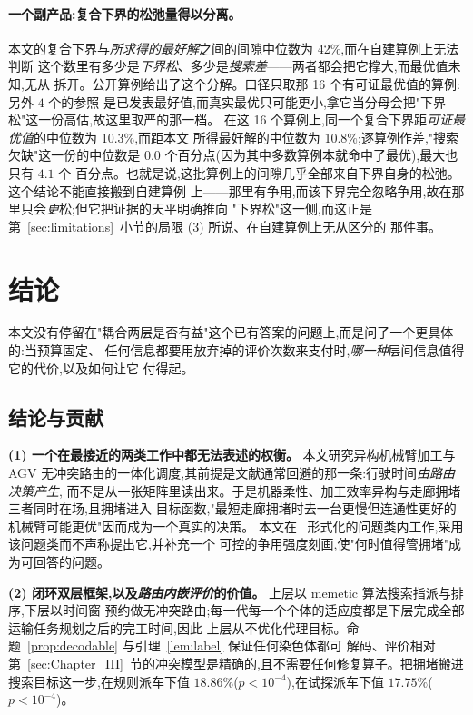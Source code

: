 \documentclass[manuscript,screen,review]{acmart}
\newcommand{\GainLoopRule}{18.86\%}      %
\newcommand{\PLoopRule}{<10^{-4}}
\newcommand{\GainLoopProbe}{17.75\%}     %
\newcommand{\PLoopProbe}{<10^{-4}}
\newcommand{\LBGapMed}{42\%}
\newcommand{\PubNOpt}{16}                 %
\newcommand{\PubLBSlack}{10.3\%}          %
\newcommand{\PubLBTotal}{10.8\%}          %
\newcommand{\PubLBResidMed}{0.0}          %
\newcommand{\PubLBResidMax}{4.1}          %
\begin{document}
\paragraph{一个副产品:复合下界的松弛量得以分离。}
本文的复合下界与\emph{所求得的最好解}之间的间隙中位数为 \LBGapMed{},而在自建算例上无法判断
这个数里有多少是\emph{下界松}、多少是\emph{搜索差}——两者都会把它撑大,而最优值未知,无从
拆开。公开算例给出了这个分解。口径只取那 \PubNOpt{} 个有可证最优值的算例:另外 $4$ 个的参照
是已发表最好值,而真实最优只可能更小,拿它当分母会把"下界松"这一份高估,故这里取严的那一档。
在这 \PubNOpt{} 个算例上,同一个复合下界距\emph{可证最优值}的中位数为 \PubLBSlack{},而距本文
所得最好解的中位数为 \PubLBTotal{};逐算例作差,"搜索欠缺"这一份的中位数是
$\PubLBResidMed$ 个百分点(因为其中多数算例本就命中了最优),最大也只有 $\PubLBResidMax$ 个
百分点。也就是说,这批算例上的间隙几乎全部来自下界自身的松弛。这个结论不能直接搬到自建算例
上——那里有争用,而该下界完全忽略争用,故在那里只会\emph{更}松;但它把证据的天平明确推向
"下界松"这一侧,而这正是第~\ref{sec:limitations}~小节的局限 (3) 所说、在自建算例上无从区分的
那件事。

\section{结论}

本文没有停留在"耦合两层是否有益"这个已有答案的问题上,而是问了一个更具体的:当预算固定、
任何信息都要用放弃掉的评价次数来支付时,\emph{哪一种}层间信息值得它的代价,以及如何让它
付得起。

\subsection{结论与贡献}
\label{sec:contributions}

\textbf{(1) 一个在最接近的两类工作中都无法表述的权衡。} 本文研究异构机械臂加工与 AGV
无冲突路由的一体化调度,其前提是文献通常回避的那一条:行驶时间\emph{由路由决策产生},
而不是从一张矩阵里读出来。于是机器柔性、加工效率异构与走廊拥堵三者同时在场,且拥堵进入
目标函数,"最短走廊拥堵时去一台更慢但连通性更好的机械臂可能更优"因而成为一个真实的决策。
本文在~\cite{vanos2026exact} 形式化的问题类内工作,采用该问题类而不声称提出它,并补充一个
可控的争用强度刻画,使"何时值得管拥堵"成为可回答的问题。

\textbf{(2) 闭环双层框架,以及\emph{路由内嵌评价}的价值。} 上层以 memetic 算法搜索指派与排序,下层以时间窗
预约做无冲突路由;每一代每一个个体的适应度都是下层完成全部运输任务规划之后的完工时间,因此
上层从不优化代理目标。命题~\ref{prop:decodable} 与引理~\ref{lem:label} 保证任何染色体都可
解码、评价相对第~\ref{sec:Chapter_III}~节的冲突模型是精确的,且不需要任何修复算子。把拥堵搬进
搜索目标这一步,在规则派车下值 $\GainLoopRule$($p\PLoopRule$),在试探派车下值
$\GainLoopProbe$($p\PLoopProbe$)。
\end{document}
